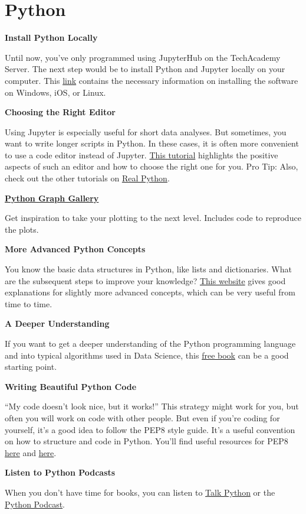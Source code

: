\documentclass[
  11pt,
]{book}
\newenvironment{tipsp}[1]
  {
  \begin{itemize}
  \footnotesize
  \renewcommand{\labelitemi}{
    \raisebox{-.7\height}[0pt][0pt]{
      {\setkeys{Gin}{width=3em,keepaspectratio}
        \texttt{[image: images/\#1.png]}}
    }
  }
  \setlength{\fboxsep}{1em}
  \begin{pbox}
  \item
  }
  {
  \end{pbox}
  \end{itemize}
  }
\begin{document}
\hypertarget{python}{%
\section{Python}\label{python}}

\begin{tipsp}p

\textbf{Install Python Locally}

Until now, you've only programmed using JupyterHub on the TechAcademy Server. The next step would be to install Python and Jupyter locally on your computer. This \href{https://docs.anaconda.com/anaconda/install/}{link} contains the necessary information on installing the software on Windows, iOS, or Linux.

\textbf{Choosing the Right Editor}

Using Jupyter is especially useful for short data analyses. But sometimes, you want to write longer scripts in Python. In these cases, it is often more convenient to use a code editor instead of Jupyter. \href{https://realpython.com/learning-paths/perfect-your-python-development-setup/}{This tutorial} highlights the positive aspects of such an editor and how to choose the right one for you. Pro Tip: Also, check out the other tutorials on \href{https://realpython.com/}{Real Python}.

\textbf{\href{https://python-graph-gallery.com/}{Python Graph Gallery}}

Get inspiration to take your plotting to the next level. Includes code to reproduce the plots.

\textbf{More Advanced Python Concepts}

You know the basic data structures in Python, like lists and dictionaries. What are the subsequent steps to improve your knowledge? \href{https://book.pythontips.com/en/latest/index.html}{This website} gives good explanations for slightly more advanced concepts, which can be very useful from time to time.

\textbf{A Deeper Understanding}

If you want to get a deeper understanding of the Python programming language and into typical algorithms used in Data Science, this \href{https://github.com/ab-anand/py-books/blob/master/Data\%20Science\%20from\%20Scratch-\%20First\%20Principles\%20with\%20Python.pdf}{free book} can be a good starting point.

\textbf{Writing Beautiful Python Code}

``My code doesn't look nice, but it works!''
This strategy might work for you, but often you will work on code with other people. But even if you're coding for yourself, it's a good idea to follow the PEP8 style guide. It's a useful convention on how to structure and code in Python. You'll find useful resources for PEP8 \href{https://realpython.com/python-pep8/}{here} and \href{https://www.python.org/dev/peps/pep-0020/\#id2}{here}.

\textbf{Listen to Python Podcasts}

When you don't have time for books, you can listen to \href{https://talkpython.fm/home}{Talk Python} or the \href{https://www.pythonpodcast.com}{Python Podcast}.

\end{tipsp}

  
\end{document}
